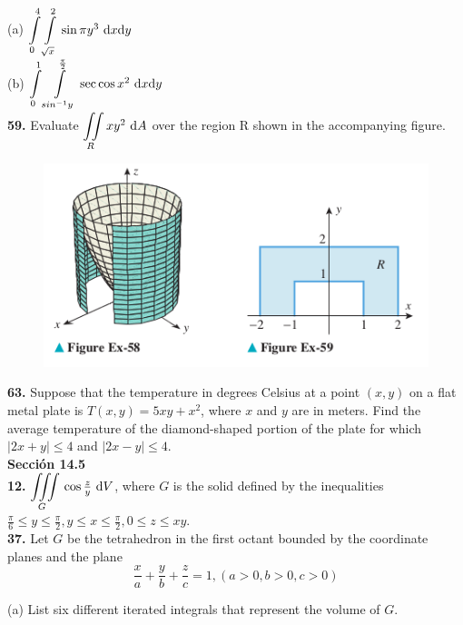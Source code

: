 \documentclass[a4paper,12pt]{article}
\begin{document}
(a) $ {\displaystyle \int \limits_0^4 \int \limits_{\sqrt{x}}^2 } \, \sin{\pi y^3} \, \, \text dx \text dy $ \\

(b) $ {\displaystyle \int \limits_0^1 \int \limits_{sin^{-1}y}^{\frac{\pi}{2}} } \, \sec{\cos{x}}^2 \, \, \text dx \text dy $ \\

\textbf{59.} Evaluate $ {\displaystyle \iint \limits_R } \, xy^2 \, \, \text dA $ over
the region R shown in the accompanying figure. \\
\begin{figure}[h]
\includegraphics[scale=0.5]{img2.png}
\centering
\end{figure}

\textbf{63.} Suppose that the temperature in degrees Celsius at a point $(x, y)$
on a flat metal plate is $T(x, y) = 5xy + x^2 $, where $x$ and $y$ are in meters.
Find the average temperature of the diamond-shaped portion of the plate for which
$|2x + y| \leq 4$ and $|2x - y| \leq 4$. \\

\textbf{Sección 14.5} \\

\textbf{12.} $ {\displaystyle \iiint \limits_G } \, \cos{\frac{z}{y}} \, \, \text dV $,
where $G$ is the solid defined by the inequalities
$\frac{\pi}{6} \leq y \leq \frac{\pi}{2}, y \leq x \leq \frac{\pi}{2}, 0 \leq z \leq xy$. \\


\textbf{37.} Let $G$ be the tetrahedron in the first octant bounded by the
coordinate planes and the plane \\

\[ \frac{x}{a} + \frac{y}{b} + \frac{z}{c} = 1, (a > 0, b > 0, c > 0) \]

(a) List six different iterated integrals that represent the volume of $G$. \\
\end{document}

